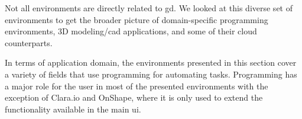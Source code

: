 %
%

Not all environments are directly related to \gls{gd}. We looked at this diverse set of environments to get the broader picture of domain-specific programming environments, 3D modeling/\gls{cad} applications, and some of their cloud counterparts.

In terms of application domain, the environments presented in this section cover a variety of fields that use programming for automating tasks.
Programming has a major role for the user in most of the presented environments with the exception of Clara.io\cite{houston2013clara} and OnShape, where it is only used to extend the functionality available in the main \gls{ui}.

